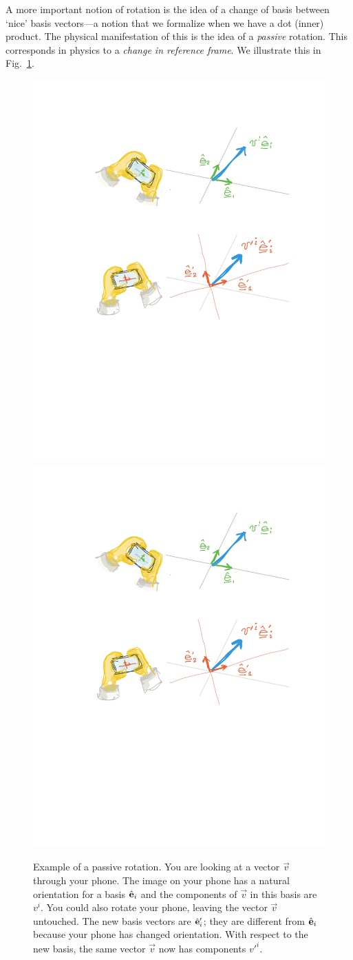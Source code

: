 \documentclass[12pt]{article}
\begin{document}
A more important notion of rotation is the idea of a change of basis between `nice' basis vectors---a notion that we formalize when we have a dot (inner) product. The physical manifestation of this is the idea of a \emph{passive} rotation. This corresponds in physics to a \emph{change in reference frame}. We illustrate this in Fig.~\ref{fig:passive:rotation}. 
\begin{figure}[tb]
    \centering
    \includegraphics[width=.43\textwidth]{figures/rotate_1.pdf}
    \quad\quad
    \includegraphics[width=.43\textwidth]{figures/rotate_2.pdf}
    \caption{Example of a passive rotation. You are looking at a vector $\vec{v}$ through your phone. The image on your phone has a natural orientation for a basis $\hat{\mathbf{e}}_i$ and the components of $\vec{v}$ in this basis are $v^i$. You could also rotate your phone, leaving the vector $\vec{v}$ untouched. The new basis vectors are $\hat{\mathbf{e}}_i'$; they are different from $\hat{\mathbf{e}}_i$ because your phone has changed orientation. With respect to the new basis, the same vector $\vec{v}$ now has components $v'^i$.}
    \label{fig:passive:rotation}
\end{figure}
\end{document}
